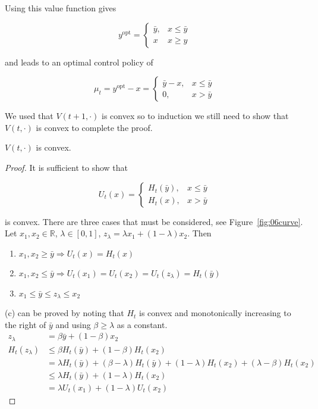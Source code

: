 Using this value function gives

\begin{equation*}
y^{\text{opt}} = \begin{cases} \bar{y}, & x\leq\bar{y} \\ x & x\geq y \end{cases}
\end{equation*}

and leads to an optimal control policy of

\begin{equation*}
\mu_t = y^{\text{opt}}-x = \begin{cases} \bar{y}-x, & x\leq\bar{y} \\ 0, & x>\bar{y} \end{cases}
\end{equation*}

We used that $V(t+1,\cdot)$ is convex  so to induction we still need to show that $V(t,\cdot)$ is convex to complete the proof.

\begin{theorem}
$V(t,\cdot)$ is convex.
\end{theorem}

\begin{proof}
It is sufficient to show that

\begin{equation*}
U_t(x) = \begin{cases} H_t(\bar{y}), & x\leq\bar{y} \\ H_t(x), & x>\bar{y} \end{cases}
\end{equation*}

is convex.
There are three cases that must be considered, see Figure~\ref{fig:06curve}.
Let $x_1,x_2\in\mathbb{R}$, $\lambda\in[0,1]$, $z_\lambda = \lambda x_1 + (1-\lambda)x_2$.
Then
\begin{enumerate}
\item $x_1,x_2\geq\bar{y} \Rightarrow U_t(x) = H_t(x)$
\item $x_1,x_2\leq\bar{y} \Rightarrow U_t(x_1) = U_t(x_2) = U_t(z_\lambda) = H_t(\bar{y})$
\item $x_1\leq\bar{y}\leq z_\lambda\leq x_2$
\end{enumerate}
(c) can be proved by noting that $H_t$ is convex and monotonically increasing to the right of $\bar{y}$ and using $\beta\geq\lambda$ as a constant.
\begin{align*}
z_\lambda &= \beta\bar{y} + (1-\beta)x_2 \\
H_t(z_\lambda) &\leq \beta H_t(\bar{y})+(1-\beta)H_t(x_2) \\
&= \lambda H_t(\bar{y})+(\beta-\lambda)H_t(\bar{y}) + (1-\lambda)H_t(x_2) + (\lambda-\beta)H_t(x_2) \\
&\leq \lambda H_t(\bar{y}) + (1-\lambda)H_t(x_2) \\
&= \lambda U_t(x_1) + (1-\lambda)U_t(x_2)
\end{align*}
\end{proof}

